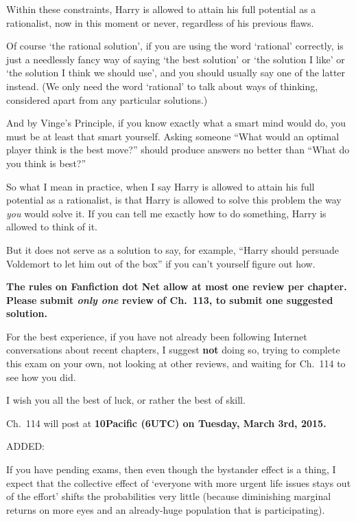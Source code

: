 {\setlength{\parindent}{0pt}
\setlength{\parskip}{.5\baselineskip}
Within these constraints, Harry is allowed to attain his full potential as a rationalist, now in this moment or never, regardless of his previous flaws.

Of course ‘the rational solution’, if you are using the word ‘rational’ correctly, is just a needlessly fancy way of saying ‘the best solution’ or ‘the solution I like’ or ‘the solution I think we should use’, and you should usually say one of the latter instead. (We only need the word ‘rational’ to talk about ways of thinking, considered apart from any particular solutions.)

And by Vinge’s Principle, if you know exactly what a smart mind would do, you must be at least that smart yourself. Asking someone “What would an optimal player think is the best move?” should produce answers no better than “What do you think is best?”

So what I mean in practice, when I say Harry is allowed to attain his full potential as a
rationalist, is that Harry is allowed to solve this problem the way \emph{you} would solve it. If you can tell me exactly how to do something, Harry is allowed to think of it.

But it does not serve as a solution to say, for example, “Harry should persuade Voldemort to let him out of the box” if you can’t yourself figure out how.

\textbf{The rules on Fanfiction dot Net allow at most one review per chapter. Please submit \emph{only one} review of Ch.~113, to submit one suggested solution.}

For the best experience, if you have not already been following Internet conversations about recent chapters, I suggest \textbf{not} doing so, trying to complete this exam on your own, not looking at other reviews, and waiting for Ch.~114 to see how you did.

I wish you all the best of luck, or rather the best of skill.

Ch.~114 will post at \textbf{10\am Pacific (6\pm UTC) on Tuesday, March 3rd, 2015.}

ADDED:

If you have pending exams, then even though the bystander effect is a thing,
I expect that the collective effect of ‘everyone with more urgent life issues stays out of the effort’ shifts the probabilities very little (because diminishing marginal returns on more eyes and an already-huge population that is participating).

}
